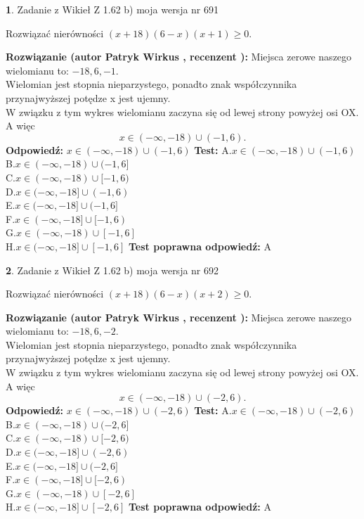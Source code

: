 \documentclass[12pt, a4paper]{article}
\theoremstyle{definition} %
\newtheorem{zad}{}
\newcommand{\zadStart}[1]{\begin{zad}#1\newline}
\newcommand{\zadStop}{\end{zad}}
\newcommand{\rozwStart}[2]{\noindent \textbf{Rozwiązanie (autor #1 , recenzent #2): }\newline}
\newcommand{\rozwStop}{\newline}
\newcommand{\odpStart}{\noindent \textbf{Odpowiedź:}\newline}
\newcommand{\odpStop}{\newline}
\newcommand{\testStart}{\noindent \textbf{Test:}\newline}
\newcommand{\testStop}{\newline}
\newcommand{\kluczStart}{\noindent \textbf{Test poprawna odpowiedź:}\newline}
\newcommand{\kluczStop}{\newline}
\begin{document}
\zadStart{Zadanie z Wikieł Z 1.62 b) moja wersja nr 691}

Rozwiązać nierówności $(x+18)(6-x)(x+1)\ge0$.
\zadStop
\rozwStart{Patryk Wirkus}{}
Miejsca zerowe naszego wielomianu to: $-18, 6, -1$.\\
Wielomian jest stopnia nieparzystego, ponadto znak współczynnika przy\linebreak najwyższej potędze x jest ujemny.\\ W związku z tym wykres wielomianu zaczyna się od lewej strony powyżej osi OX. A więc $$x \in (-\infty,-18) \cup (-1,6).$$
\rozwStop
\odpStart
$x \in (-\infty,-18) \cup (-1,6)$
\odpStop
\testStart
A.$x \in (-\infty,-18) \cup (-1,6)$\\
B.$x \in (-\infty,-18) \cup (-1,6]$\\
C.$x \in (-\infty,-18) \cup [-1,6)$\\
D.$x \in (-\infty,-18] \cup (-1,6)$\\
E.$x \in (-\infty,-18] \cup (-1,6]$\\
F.$x \in (-\infty,-18] \cup [-1,6)$\\
G.$x \in (-\infty,-18) \cup [-1,6]$\\
H.$x \in (-\infty,-18] \cup [-1,6]$
\testStop
\kluczStart
A
\kluczStop



\zadStart{Zadanie z Wikieł Z 1.62 b) moja wersja nr 692}

Rozwiązać nierówności $(x+18)(6-x)(x+2)\ge0$.
\zadStop
\rozwStart{Patryk Wirkus}{}
Miejsca zerowe naszego wielomianu to: $-18, 6, -2$.\\
Wielomian jest stopnia nieparzystego, ponadto znak współczynnika przy\linebreak najwyższej potędze x jest ujemny.\\ W związku z tym wykres wielomianu zaczyna się od lewej strony powyżej osi OX. A więc $$x \in (-\infty,-18) \cup (-2,6).$$
\rozwStop
\odpStart
$x \in (-\infty,-18) \cup (-2,6)$
\odpStop
\testStart
A.$x \in (-\infty,-18) \cup (-2,6)$\\
B.$x \in (-\infty,-18) \cup (-2,6]$\\
C.$x \in (-\infty,-18) \cup [-2,6)$\\
D.$x \in (-\infty,-18] \cup (-2,6)$\\
E.$x \in (-\infty,-18] \cup (-2,6]$\\
F.$x \in (-\infty,-18] \cup [-2,6)$\\
G.$x \in (-\infty,-18) \cup [-2,6]$\\
H.$x \in (-\infty,-18] \cup [-2,6]$
\testStop
\kluczStart
A
\kluczStop
\end{document}
